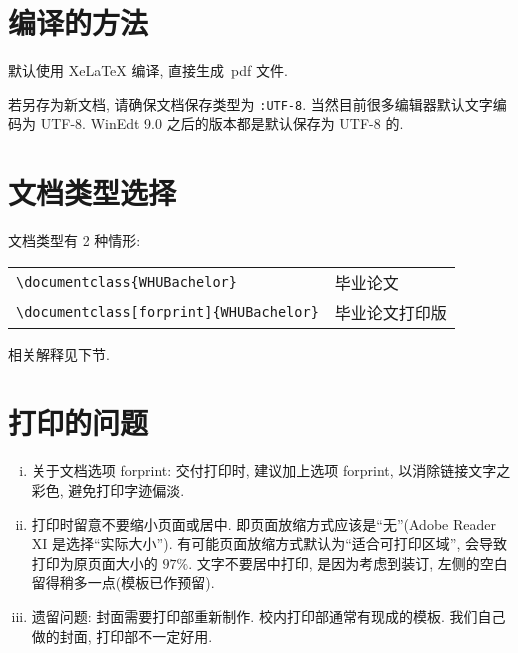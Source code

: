\documentclass[forprint]{WHUBachelor}
\begin{document}
\section{编译的方法}\label{sec-compile}

默认使用 XeLaTeX 编译, 直接生成~pdf 文件.

若另存为新文档, 请确保文档保存类型为 \verb|:UTF-8|. 当然目前很多编辑器默认文字编码为 UTF-8.
WinEdt 9.0 之后的版本都是默认保存为 UTF-8 的.


%





\section{文档类型选择}
文档类型有 2 种情形:

\begin{table}[ht]\centering
\begin{tabular}{ll}
\hline
   \verb|\documentclass{WHUBachelor}|                     &  毕业论文 \\
   \verb|\documentclass[forprint]{WHUBachelor}|        &  毕业论文打印版 \\
\hline
\end{tabular}
\end{table}
相关解释见下节.


\section{打印的问题}
\begin{enumerate}[i)]
  \item  关于文档选项 forprint: 交付打印时, 建议加上选项 forprint, 以消除链接文字之彩色, 避免打印字迹偏淡.
  \item  打印时留意不要缩小页面或居中. 即页面放缩方式应该是``无''(Adobe Reader XI 是选择``实际大小'').
           有可能页面放缩方式默认为``适合可打印区域'', 会导致打印为原页面大小的 $97\%$.
           文字不要居中打印, 是因为考虑到装订, 左侧的空白留得稍多一点(模板已作预留).
  \item  遗留问题: 封面需要打印部重新制作.  校内打印部通常有现成的模板.
           我们自己做的封面, 打印部不一定好用.
\end{enumerate}
\end{document}
